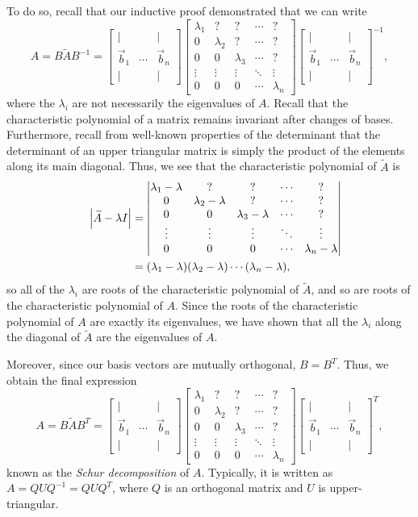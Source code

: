 \documentclass[letterpaper]{article}
\theoremstyle{remark}
\renewcommand{\tilde}[1]{\widetilde{#1}}
\newcommand{\mat}[1]{\ensuremath{\begin{bmatrix}#1\end{bmatrix}}}
\newcommand{\cat}[1]{\ensuremath{\begin{vmatrix}#1\end{vmatrix}}}
\newcommand{\eqn}[1]{\begin{alignat*}{2}#1\end{alignat*}}
\begin{document}
To do so, recall that our inductive proof demonstrated that we can write
\[
    A = B\tilde{A}B^{-1} = \mat{| & & | \\ \vec{b}_1 & \cdots & \vec{b}_n \\ | & & |}\mat{
    \lambda_1 & ? & ? & \cdots & ? \\ 
    0 & \lambda_2 & ? & \cdots & ? \\
    0 & 0 & \lambda_3 & \cdots & ? \\
    \vdots & \vdots & \vdots & \ddots & \vdots \\
    0 & 0 & 0 & \cdots & \lambda_n}\mat{| & & | \\ \vec{b}_1 & \cdots & \vec{b}_n \\ | & & |}^{-1},
\]
where the $\lambda_i$ are not necessarily the eigenvalues of $A$. Recall that the characteristic polynomial of a matrix remains invariant after changes of bases. Furthermore, recall from well-known properties of the determinant that the determinant of an upper triangular matrix is simply the product of the elements along its main diagonal. Thus, we see that the characteristic polynomial of $\tilde{A}$ is
\eqn{
    && \abs{\tilde{A} - \lambda I} &= \cat{
    \lambda_1 - \lambda & ? & ? & \cdots & ? \\ 
    0 & \lambda_2 - \lambda & ? & \cdots & ? \\
    0 & 0 & \lambda_3 - \lambda & \cdots & ? \\
    \vdots & \vdots & \vdots & \ddots & \vdots \\
    0 & 0 & 0 & \cdots & \lambda_n - \lambda} \\
    &&&= (\lambda_1 - \lambda)(\lambda_2 - \lambda) \cdots (\lambda_n - \lambda),
}
so all of the $\lambda_i$ are roots of the characteristic polynomial of $\tilde{A}$, and so are roots of the characteristic polynomial of $A$. Since the roots of the characteristic polynomial of $A$ are exactly its eigenvalues, we have shown that all the $\lambda_i$ along the diagonal of $\tilde{A}$ are the eigenvalues of $A$.

Moreover, since our basis vectors are mutually orthogonal, $B = B^T$. Thus, we obtain the final expression
\[
    A = B\tilde{A}B^T = \mat{| & & | \\ \vec{b}_1 & \cdots & \vec{b}_n \\ | & & |}\mat{
    \lambda_1 & ? & ? & \cdots & ? \\ 
    0 & \lambda_2 & ? & \cdots & ? \\
    0 & 0 & \lambda_3 & \cdots & ? \\
    \vdots & \vdots & \vdots & \ddots & \vdots \\
    0 & 0 & 0 & \cdots & \lambda_n}\mat{| & & | \\ \vec{b}_1 & \cdots & \vec{b}_n \\ | & & |}^T,
\]
known as the \emph{Schur decomposition} of $A$. Typically, it is written as $A = QUQ^{-1} = QUQ^T$, where $Q$ is an orthogonal matrix and $U$ is upper-triangular.
\end{document}
